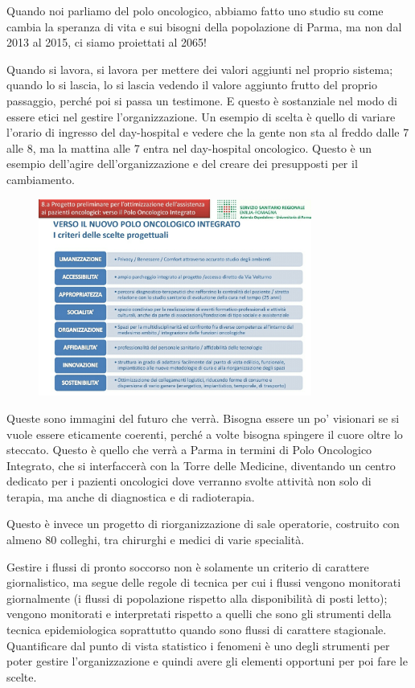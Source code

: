 Quando noi parliamo del polo oncologico, abbiamo fatto uno studio su
come cambia la speranza di vita e sui bisogni della popolazione di
Parma, ma non dal 2013 al 2015, ci siamo proiettati al 2065!

Quando si lavora, si lavora per mettere dei valori aggiunti nel proprio
sistema; quando lo si lascia, lo si lascia vedendo il valore aggiunto
frutto del proprio passaggio, perché poi si passa un testimone. E questo
è sostanziale nel modo di essere etici nel gestire l'organizzazione. Un
esempio di scelta è quello di variare l'orario di ingresso del
day-hospital e vedere che la gente non sta al freddo dalle 7 alle 8, ma
la mattina alle 7 entra nel day-hospital oncologico. Questo è un esempio
dell'agire dell'organizzazione e del creare dei presupposti per il
cambiamento.

 \begin{figure}[!ht]
\centering
	\includegraphics[width=0.8\textwidth]{32/image25.jpeg}
	\end{figure}

Queste sono immagini del futuro che verrà. Bisogna essere un po'
visionari se si vuole essere eticamente coerenti, perché a volte bisogna
spingere il cuore oltre lo steccato. Questo è quello che verrà a Parma
in termini di Polo Oncologico Integrato, che si interfaccerà con la
Torre delle Medicine, diventando un centro dedicato per i pazienti
oncologici dove verranno svolte attività non solo di terapia, ma anche
di diagnostica e di radioterapia.

Questo è invece un progetto di riorganizzazione di sale operatorie,
costruito con almeno 80 colleghi, tra chirurghi e medici di varie
specialità.

Gestire i flussi di pronto soccorso non è solamente un criterio di
carattere giornalistico, ma segue delle regole di tecnica per cui i
flussi vengono monitorati giornalmente (i flussi di popolazione rispetto
alla disponibilità di posti letto); vengono monitorati e interpretati
rispetto a quelli che sono gli strumenti della tecnica epidemiologica
soprattutto quando sono flussi di carattere stagionale. Quantificare dal
punto di vista statistico i fenomeni è uno degli strumenti per poter
gestire l'organizzazione e quindi avere gli elementi opportuni per poi
fare le scelte.


